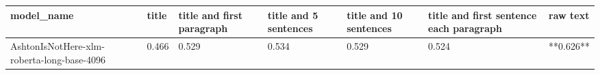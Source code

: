 \begin{tabular}{lllllll}
\toprule
                                model\_name & title & title and first paragraph & title and 5 sentences & title and 10 sentences & title and first sentence each paragraph &  raw text \\
\midrule
AshtonIsNotHere-xlm-roberta-long-base-4096 & 0.466 &                     0.529 &                 0.534 &                  0.529 &                                   0.524 & **0.626** \\
\bottomrule
\end{tabular}
